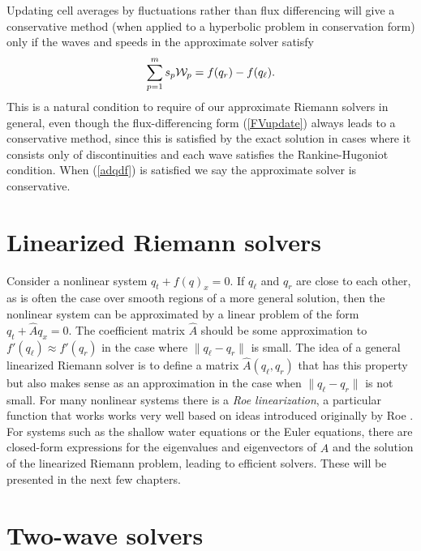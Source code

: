 \documentclass{SIAMbook2016}
\begin{document}
Updating cell averages by fluctuations rather than flux differencing
will give a conservative method (when applied to a hyperbolic problem in
conservation form) only if the waves and speeds in the approximate
solver satisfy \begin{align}
\label{adqdf}
\sum_{p=1}^m s_p {\cal W}_p = f(q_r) - f(q_\ell).
\end{align} This is a natural condition to require of our approximate
Riemann solvers in general, even though the flux-differencing form
(\ref{FVupdate}) always leads to a conservative method, since this is
satisfied by the exact solution in cases where it consists only of
discontinuities and each wave satisfies the Rankine-Hugoniot condition.
When (\ref{adqdf}) is satisfied we say the approximate solver is
conservative.

\hypertarget{linearized-riemann-solvers}{%
\section{Linearized Riemann solvers}\label{linearized-riemann-solvers}}

Consider a nonlinear system \(q_t + f(q)_x = 0\). If \(q_\ell\) and
\(q_r\) are close to each other, as is often the case over smooth
regions of a more general solution, then the nonlinear system can be
approximated by a linear problem of the form \(q_t + \hat A q_x = 0\).
The coefficient matrix \(\hat A\) should be some approximation to
\(f'(q_\ell) \approx f'(q_r)\) in the case where \(\|q_\ell-q_r\|\) is
small. The idea of a general linearized Riemann solver is to define a
matrix \(\hat A(q_\ell, q_r)\) that has this property but also makes
sense as an approximation in the case when \(\|q_\ell-q_r\|\) is not
small. For many nonlinear systems there is a \emph{Roe linearization}, a
particular function that works works very well based on ideas introduced
originally by Roe \cite{Roe1981}. For systems such as the shallow water
equations or the Euler equations, there are closed-form expressions for
the eigenvalues and eigenvectors of \(\hat A\) and the solution of the
linearized Riemann problem, leading to efficient solvers. These will be
presented in the next few chapters.

\hypertarget{two-wave-solvers}{%
\section{Two-wave solvers}\label{two-wave-solvers}}
\end{document}
